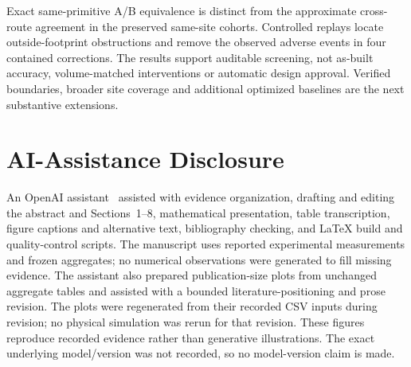 \documentclass{llncs}
\begin{document}
Exact same-primitive A/B equivalence is distinct from the approximate cross-route agreement in the preserved same-site cohorts. Controlled replays locate outside-footprint obstructions and remove the observed adverse events in four contained corrections. The results support auditable screening, not as-built accuracy, volume-matched interventions or automatic design approval. Verified boundaries, broader site coverage and additional optimized baselines are the next substantive extensions.

\section*{AI-Assistance Disclosure}
An OpenAI assistant~\cite{openai2026} assisted with evidence organization, drafting and editing the abstract and Sections~1--8, mathematical presentation, table transcription, figure captions and alternative text, bibliography checking, and LaTeX build and quality-control scripts. The manuscript uses reported experimental measurements and frozen aggregates; no numerical observations were generated to fill missing evidence. The assistant also prepared publication-size plots from unchanged aggregate tables and assisted with a bounded literature-positioning and prose revision. The plots were regenerated from their recorded CSV inputs during revision; no physical simulation was rerun for that revision. These figures reproduce recorded evidence rather than generative illustrations.  The exact underlying model/version was not recorded, so no model-version claim is made.

\FloatBarrier


\end{document}

